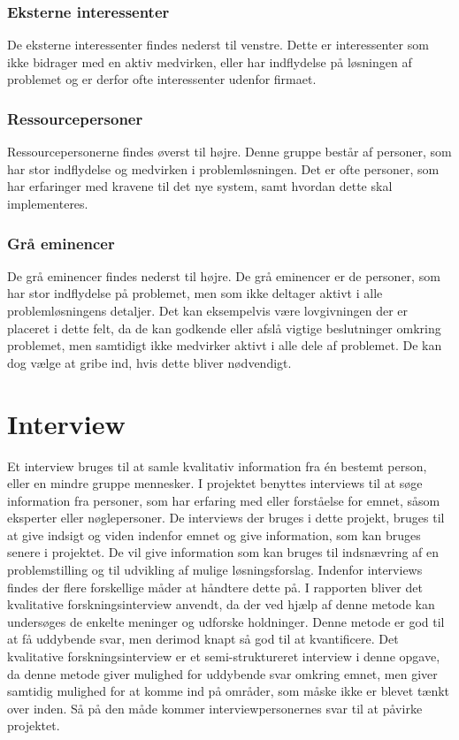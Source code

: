 \subsubsection{Eksterne interessenter}
De eksterne interessenter findes nederst til venstre. Dette er interessenter som ikke bidrager med en aktiv medvirken, eller har indflydelse på løsningen af problemet og er derfor ofte interessenter udenfor firmaet. \citep{MetteLindegaardAttrup2008}

\subsubsection{Ressourcepersoner}
Ressourcepersonerne findes øverst til højre. Denne gruppe består af personer, som har stor indflydelse og medvirken i problemløsningen. Det er ofte personer, som har erfaringer med kravene til det nye system, samt hvordan dette skal implementeres. \citep{MetteLindegaardAttrup2008}

\subsubsection{Grå eminencer}
De grå eminencer findes nederst til højre. De grå eminencer er de personer, som har stor indflydelse på problemet, men som ikke deltager aktivt i alle problemløsningens detaljer. Det kan eksempelvis være lovgivningen der er placeret i dette felt, da de kan godkende eller afslå vigtige beslutninger omkring problemet, men samtidigt ikke medvirker aktivt i alle dele af problemet. De kan dog vælge at gribe ind, hvis dette bliver nødvendigt. \citep{MetteLindegaardAttrup2008}

\section{Interview}
Et interview bruges til at samle kvalitativ information fra én bestemt person, eller en mindre gruppe mennesker. I projektet benyttes interviews til at søge information fra personer, som har erfaring med eller forståelse for emnet, såsom eksperter eller nøglepersoner. De interviews der bruges i dette projekt, bruges til at give indsigt og viden indenfor emnet og give information, som kan bruges senere i projektet. De vil give information som kan bruges til indsnævring af en problemstilling og til udvikling af mulige løsningsforslag.
Indenfor interviews findes der flere forskellige måder at håndtere dette på. I rapporten bliver det kvalitative forskningsinterview anvendt, da der ved hjælp af denne metode kan undersøges de enkelte meninger og udforske holdninger. Denne metode er god til at få uddybende svar, men derimod knapt så god til at kvantificere.
Det kvalitative forskningsinterview er et semi-struktureret interview i denne opgave, da denne metode giver mulighed for uddybende svar omkring emnet, men giver samtidig mulighed for at komme ind på områder, som måske ikke er blevet tænkt over inden. Så på den måde kommer interviewpersonernes svar til at påvirke projektet. \citep{BjarneHjorthAndersen, kvale2009}

